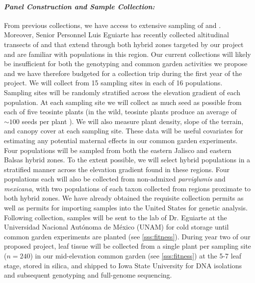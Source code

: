 \paragraph{\emph{Panel Construction and Sample Collection:}}
From previous collections, we have access to extensive sampling of \zm{} and \zp{}.
Moreover, Senior Personnel Luis Eguiarte has recently collected altitudinal transects of \zp{} and \zm{} that extend through both hybrid zones targeted by our project \citep{Diez2013} and are  familiar with populations in this region.
Our current collections will likely be insufficient for both the genotyping and common garden activities we propose and we have therefore budgeted for a collection trip during the first year of the project.
We will collect from 15 sampling sites in each of 16 populations.
Sampling sites will be randomly stratified across the elevation gradient of each population.
At each sampling site we will collect as much seed as possible from each of five teosinte plants (in the wild, teosinte plants produce an average of $\sim 100$ seeds per plant \citep{wilkes1967teosinte}). 
We will also measure plant density, slope of the terrain, and canopy cover at each sampling site.  These data will be useful covariates for estimating any potential maternal effects in our common garden experiments.  Four populations will be sampled from both the eastern Jalisco and eastern Balsas hybrid zones.  To the extent possible, we will select hybrid populations in a stratified manner across the elevation gradient found in these regions. Four populations each will also be collected from non-admixed \emph{parviglumis} and \emph{mexicana}, with two populations of each taxon collected from regions proximate to both hybrid zones.  We have already obtained the requisite collection permits as well as permits for importing samples into the United States for genetic analysis. Following collection, samples will be sent to the lab of Dr. Eguiarte at the Universidad Nacional Aut\'{o}noma de M\'{e}xico (UNAM) for cold storage until common garden experiments are planted (see \ref{sss:fitness}).  During year two of our proposed project, leaf tissue will be collected from a single plant per sampling site ($n=240$) in our mid-elevation common garden (see \ref{sss:fitness}) at the 5-7 leaf stage, stored in silica, and shipped to Iowa State University for DNA isolations and subsequent genotyping and full-genome sequencing.


